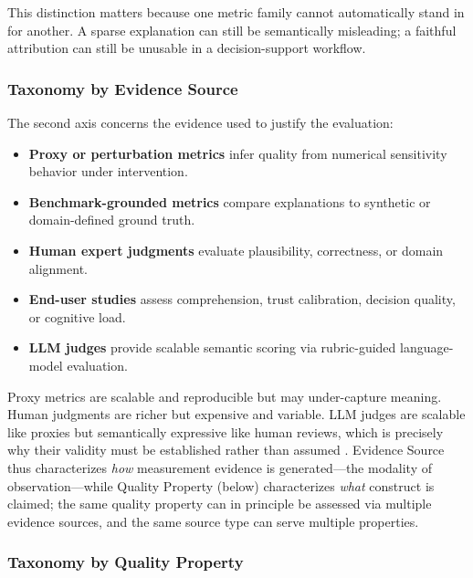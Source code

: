 \documentclass[10pt,a4paper,twoside]{article}
\begin{document}
This distinction matters because one metric family cannot automatically
stand in for another. A sparse explanation can still be semantically
misleading; a faithful attribution can still be unusable in a
decision-support workflow.

\subsubsection{Taxonomy by Evidence Source}

The second axis concerns the evidence used to justify the evaluation:
\begin{itemize}[leftmargin=*]
\item \textbf{Proxy or perturbation metrics} infer quality from numerical
sensitivity behavior under intervention.
\item \textbf{Benchmark-grounded metrics} compare explanations to
synthetic or domain-defined ground truth.
\item \textbf{Human expert judgments} evaluate plausibility, correctness,
or domain alignment.
\item \textbf{End-user studies} assess comprehension, trust calibration,
decision quality, or cognitive load.
\item \textbf{LLM judges} provide scalable semantic scoring via
rubric-guided language-model evaluation.
\end{itemize}

Proxy metrics are scalable and reproducible but may under-capture meaning.
Human judgments are richer but expensive and variable. LLM judges are
scalable like proxies but semantically expressive like human reviews,
which is precisely why their validity must be established rather than
assumed \citep{gu2024llmjudge,wu2025userperceptions,zhou2025medthink}.
Evidence Source thus characterizes \emph{how} measurement evidence is generated---the modality of observation---while Quality Property (below) characterizes \emph{what} construct is claimed; the same quality property can in principle be assessed via multiple evidence sources, and the same source type can serve multiple properties.

\subsubsection{Taxonomy by Quality Property}
\end{document}
